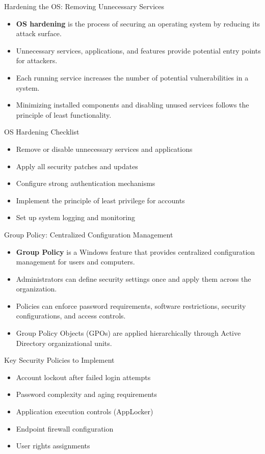 \documentclass{beamer}
\begin{document}
\begin{frame}{Hardening the OS: Removing Unnecessary Services}
\begin{itemize}
\item \textbf{OS hardening} is the process of securing an operating system by reducing its attack surface.
\item Unnecessary services, applications, and features provide potential entry points for attackers.
\item Each running service increases the number of potential vulnerabilities in a system.
\item Minimizing installed components and disabling unused services follows the principle of least functionality.
\end{itemize}

\begin{exampleblock}{OS Hardening Checklist}
\begin{itemize}
\item Remove or disable unnecessary services and applications
\item Apply all security patches and updates
\item Configure strong authentication mechanisms
\item Implement the principle of least privilege for accounts
\item Set up system logging and monitoring
\end{itemize}
\end{exampleblock}
\end{frame}

\begin{frame}{Group Policy: Centralized Configuration Management}
\begin{itemize}
\item \textbf{Group Policy} is a Windows feature that provides centralized configuration management for users and computers.
\item Administrators can define security settings once and apply them across the organization.
\item Policies can enforce password requirements, software restrictions, security configurations, and access controls.
\item Group Policy Objects (GPOs) are applied hierarchically through Active Directory organizational units.
\end{itemize}

\begin{block}{Key Security Policies to Implement}
\begin{itemize}
\item Account lockout after failed login attempts
\item Password complexity and aging requirements
\item Application execution controls (AppLocker)
\item Endpoint firewall configuration
\item User rights assignments
\end{itemize}
\end{block}
\end{frame}
\end{document}
